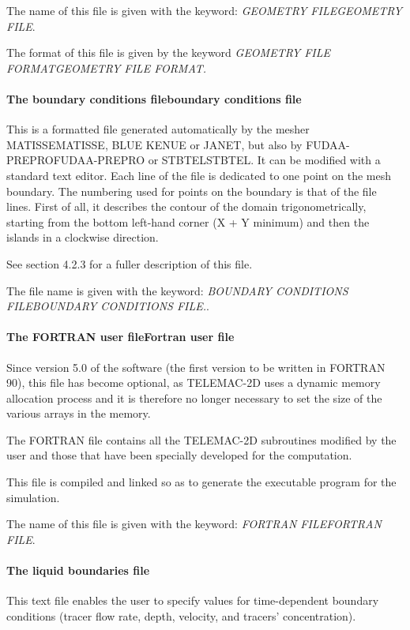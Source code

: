\documentclass{article} %
\begin{document}
 The name of this file is given with the keyword: \textit{GEOMETRY FILEGEOMETRY FILE}.

 The format of this file is given by the keyword \textit{GEOMETRY FILE FORMATGEOMETRY FILE FORMAT.}


\paragraph{  The boundary conditions fileboundary conditions file}

 This is a formatted file generated automatically by the mesher MATISSEMATISSE, BLUE KENUE or JANET, but also by FUDAA-PREPROFUDAA-PREPRO or STBTELSTBTEL. It can be modified with a standard text editor. Each line of the file is dedicated to one point on the mesh boundary. The numbering used for points on the boundary is that of the file lines. First of all, it describes the contour of the domain trigonometrically, starting from the bottom left-hand corner (X + Y minimum) and then the islands in a clockwise direction.

 See section 4.2.3 for a fuller description of this file.

 The file name is given with the keyword: \textit{BOUNDARY CONDITIONS FILEBOUNDARY CONDITIONS FILE.}.


\paragraph{ The FORTRAN user fileFortran user file}

 Since version 5.0 of the software (the first version to be written in FORTRAN 90), this file has become optional, as TELEMAC-2D uses a dynamic memory allocation process and it is therefore no longer necessary to set the size of the various arrays in the memory.

 The FORTRAN file contains all the TELEMAC-2D subroutines modified by the user and those that have been specially developed for the computation.

 This file is compiled and linked so as to generate the executable program for the simulation.

 The name of this file is given with the keyword: \textit{FORTRAN FILEFORTRAN FILE}.


\paragraph{ The liquid boundaries file}

 This text file enables the user to specify values for time-dependent boundary conditions (tracer flow rate, depth, velocity, and tracers' concentration).
\end{document}
